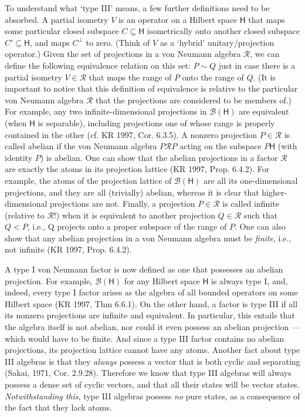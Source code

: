 \documentclass[12pt]{article}
\newcommand{\alg}[1]{\mbox{$\mathcal{#1}$}}
\newcommand{\hil}[1]{\mbox{$\mathsf{#1}$}}
\begin{document}
 
  To understand what `type III' means, a few further definitions need 
  to be absorbed.  A partial isometry $V$ is an operator on a Hilbert space $\hil{H}$ that maps 
 some particular closed subspace $C\subseteq\hil{H}$ isometrically onto 
 another closed subspace $C'\subseteq\hil{H}$, and maps $C^{\perp}$ to 
 zero.  (Think of $V$ as a `hybrid' unitary/projection operator.)  
 Given the set of projections in a von Neumann algebra 
 $\alg{R}$, we can define the following equivalence relation on 
 this set: $P\sim Q$ just in case there is a partial isometry 
 $V\in\alg{R}$ that maps the range 
 of $P$ onto the range of $Q$.  (It is important to notice that this 
 definition of equivalence is relative to the particular von Neumann algebra 
 $\alg{R}$ that the projections are considered to be members of.) For example, any two infinite-dimensional 
 projections in $\alg{B}(\hil{H})$ are equivalent (when $\hil{H}$ is 
 separable), including projections 
 one of whose range is properly contained in the other (cf. KR 1997, 
 Cor. 6.3.5).  A nonzero projection $P\in\alg{R}$ is called 
 abelian if the von Neumann algebra $P\alg{R}P$ acting on the 
 subspace $P\hil{H}$ (with identity $P$) is abelian.  One can 
 show that the abelian projections in a factor $\alg{R}$ are exactly 
 the atoms in its projection lattice (KR 1997, Prop. 
 6.4.2).  For example, the atoms of the projection lattice of 
 $\alg{B}(\hil{H})$ are all 
 its one-dimensional projections, and they are all (trivially) abelian, 
 whereas it is clear that higher-dimensional projections are not. Finally, a projection $P\in\alg{R}$ is 
 called infinite (relative to $\alg{R}$!) when it is equivalent to 
 another projection $Q\in\alg{R}$ such that $Q<P$, i.e., Q projects onto a 
 proper subspace of the range of $P$.  One can also show that any 
 abelian projection in a von Neumann algebra must be \emph{finite}, 
 i.e., not infinite 
 (KR 1997, Prop. 6.4.2).  
 
 A type I von Neumann factor is now defined as one that possesses an 
 abelian projection.  For example, $\alg{B}(\hil{H})$ for any Hilbert 
 space $\hil{H}$ is always type I, and, indeed, every type I factor arises 
 as the algebra of all bounded operators on some Hilbert space (KR 
 1997, Thm 6.6.1).  On the other hand, a factor is type III 
 if all its nonzero projections are infinite and equivalent.  In particular, this 
 entails that the algebra itself is not abelian, nor could it even possess an
 abelian projection --- which would have to be finite.  
 And since a type III factor 
 contains no abelian projections, its projection lattice cannot have any 
 atoms.  Another fact about type III algebras is that they \emph{always} 
 possess a vector that is both cyclic and separating (Sakai, 1971, Cor. 
 2.9.28).   Therefore we know that type III algebras will always
 possess a dense set of cyclic vectors, and that all their states will be 
 vector states.  \emph{Notwithstanding this}, type III algebras possess 
 \emph{no} pure states, as a consequence of the fact that they lack 
 atoms.  
 
\end{document}
